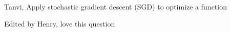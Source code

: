 \begin{parts}
\begin{subparts}
\begin{comment}
\subpart[1]{}
For the given toy dataset, what does the objective function evaluate to with the updated theta? 

    \begin{tcolorbox}[fit,height=1cm, width=2cm, blank, borderline={1pt}{-2pt}]
    \end{tcolorbox}
    \begin{soln}
    For point 1: 0
    For point 2: 2
    Ans: 1
    \end{soln}   
\end{comment}  

\end{subparts}    
\begin{qauthor}
    Tanvi, Apply stochastic gradient descent (SGD) to optimize a function

    Edited by Henry, love this question
\end{qauthor}

\begin{comment}
\part[1] \textbf{Select all that apply:} Neural is training a linear regression model to predict the prices of houses in Pittsburgh with L0 regularization of all terms including the bias term. He finds that his model has a very high error on the test data, but a low error on the train data. Which of the following apply?
    {%
    \checkboxchar{$\Box$} \checkedchar{$\blacksquare$} %
    \begin{checkboxes}
     \choice Using the test data to train would cause the error on the test data to decrease.
     \choice It is a good idea to use the test data to train, because the model will generalize well and decrease the true error.
     \choice As L0 regularization drives more terms to zero, suggest that Neural use L1 regularization instead of L0 regularization to avoid driving the bias term to zero.
     \choice Suggest that Neural not regularize the bias term at all.
    \end{checkboxes}
    }
    \begin{soln}
    A, D.
    \end{soln}
    \begin{qauthor}
    Tanvi, Explain why we should not regularize the bias term. [MCQ form]. Also incorporate parts of distinguishing between true and test error.
    

\end{comment}
\end{parts}
